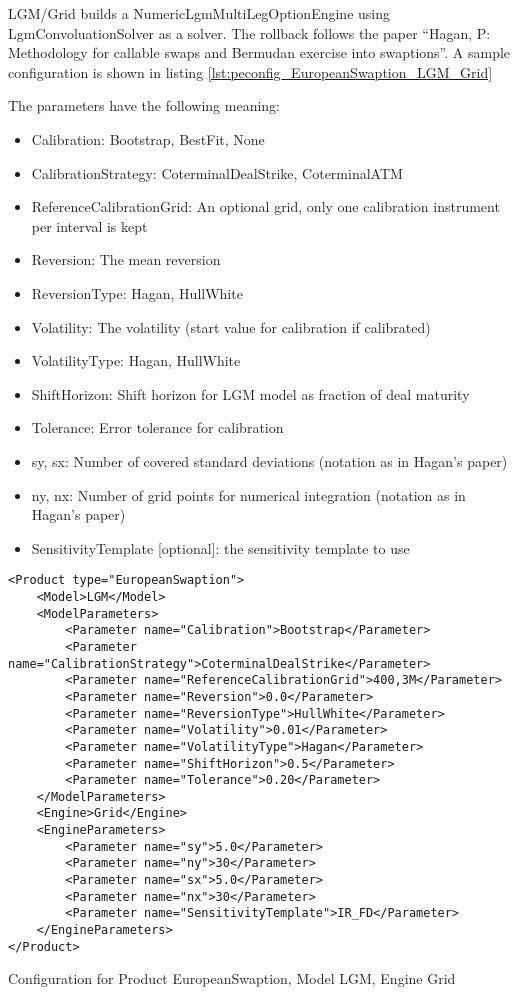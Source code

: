 LGM/Grid builds a NumericLgmMultiLegOptionEngine using LgmConvoluationSolver as a solver. The rollback follows the paper
``Hagan, P: Methodology for callable swaps and Bermudan exercise into swaptions''. A sample configuration is shown in
listing \ref{lst:peconfig_EuropeanSwaption_LGM_Grid}

The parameters have the following meaning:

\begin{itemize}
\item Calibration: Bootstrap, BestFit, None
\item CalibrationStrategy: CoterminalDealStrike, CoterminalATM
\item ReferenceCalibrationGrid: An optional grid, only one calibration instrument per interval is kept
\item Reversion: The mean reversion
\item ReversionType: Hagan, HullWhite
\item Volatility: The volatility (start value for calibration if calibrated)
\item VolatilityType: Hagan, HullWhite
\item ShiftHorizon: Shift horizon for LGM model as fraction of deal maturity
\item Tolerance: Error tolerance for calibration
\item sy, sx: Number of covered standard deviations (notation as in Hagan's paper)
\item ny, nx: Number of grid points for numerical integration (notation as in Hagan's paper)
\item SensitivityTemplate [optional]: the sensitivity template to use 
\end{itemize}

\begin{longlisting}
\begin{verbatim}
<Product type="EuropeanSwaption">
    <Model>LGM</Model>
    <ModelParameters>
        <Parameter name="Calibration">Bootstrap</Parameter>
        <Parameter name="CalibrationStrategy">CoterminalDealStrike</Parameter>
        <Parameter name="ReferenceCalibrationGrid">400,3M</Parameter>
        <Parameter name="Reversion">0.0</Parameter>
        <Parameter name="ReversionType">HullWhite</Parameter>
        <Parameter name="Volatility">0.01</Parameter>
        <Parameter name="VolatilityType">Hagan</Parameter>
        <Parameter name="ShiftHorizon">0.5</Parameter>
        <Parameter name="Tolerance">0.20</Parameter>
    </ModelParameters>
    <Engine>Grid</Engine>
    <EngineParameters>
        <Parameter name="sy">5.0</Parameter>
        <Parameter name="ny">30</Parameter>
        <Parameter name="sx">5.0</Parameter>
        <Parameter name="nx">30</Parameter>
        <Parameter name="SensitivityTemplate">IR_FD</Parameter>
    </EngineParameters>
</Product>
\end{verbatim}
\caption{Configuration for Product EuropeanSwaption, Model LGM, Engine Grid}
\label{lst:peconfig_EuropeanSwaption_LGM_Grid}
\end{longlisting}

